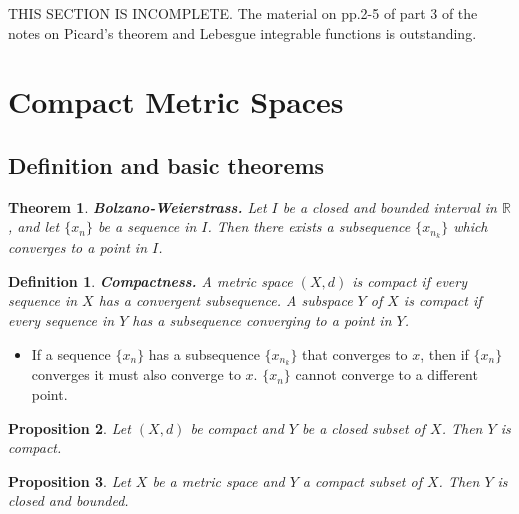 \documentclass[two column]{article}
\newtheorem{theorem}{Theorem}[subsection]
\newtheorem{proposition}[theorem]{Proposition}
\newtheorem{definition}{Definition}[subsection]
\begin{document}
THIS SECTION IS INCOMPLETE. The material on pp.2-5 of part 3 of the notes on Picard's theorem and Lebesgue integrable functions is outstanding. 


\section{Compact Metric Spaces}

\subsection{Definition and basic theorems}

\begin{theorem} \label{BWthm}
{\bf Bolzano-Weierstrass.} Let $I$ be a closed and bounded interval in $\mathbb{R}$, and let $\{ x_{n} \}$ be a sequence in $I$. Then there exists a subsequence $\{ x_{n_{k}} \}$ which converges to a point in $I$. \\
\end{theorem}

\begin{definition}
{\bf Compactness.} A metric space $(X,d)$ is compact if every sequence in $X$ has a convergent subsequence. A subspace $Y$ of $X$ is compact if every sequence in $Y$ has a subsequence converging to a point in $Y$. 
\end{definition}
\begin{itemize}
\item If a sequence $\{ x_{n} \}$ has a subsequence $\{x_{n_{k}} \}$ that converges to $x$, then if $\{ x_{n} \}$ converges it must also converge to $x$. $\{ x_{n} \}$ cannot converge to a different point. \\ 
\end{itemize}

\begin{proposition}
Let $(X,d)$ be compact and $Y$ be a closed subset of $X$. Then $Y$ is compact. \\
\end{proposition}

\begin{proposition} \label{comp ss closed and bounded}
Let $X$ be a metric space and $Y$ a compact subset of $X$. Then $Y$ is closed and bounded. \\
\end{proposition}
\end{document}
